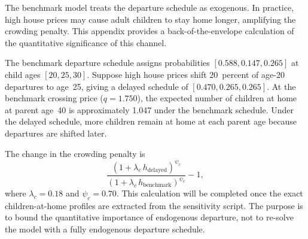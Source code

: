 \documentclass[11pt]{article}
\begin{document}
The benchmark model treats the departure schedule as exogenous. In practice, high house
prices may cause adult children to stay home longer, amplifying the crowding penalty. This
appendix provides a back-of-the-envelope calculation of the quantitative significance of
this channel.

The benchmark departure schedule assigns probabilities $[0.588, 0.147, 0.265]$ at child
ages $[20, 25, 30]$. Suppose high house prices shift 20~percent of age-20 departures to
age~25, giving a delayed schedule of $[0.470, 0.265, 0.265]$. At the benchmark crossing
price ($q = 1.750$), the expected number of children at home at parent age~40 is
approximately 1.047 under the benchmark schedule. Under the delayed schedule, more children
remain at home at each parent age because departures are shifted later.

The change in the crowding penalty is
\[
\frac{(1 + \lambda_c \, h_{\text{delayed}})^{\psi_c}}{(1 + \lambda_c \, h_{\text{benchmark}})^{\psi_c}} - 1,
\]
where $\lambda_c = 0.18$ and $\psi_c = 0.70$. This calculation will be completed once the
exact children-at-home profiles are extracted from the sensitivity script. The purpose is to
bound the quantitative importance of endogenous departure, not to re-solve the model with a
fully endogenous departure schedule.
\end{document}
